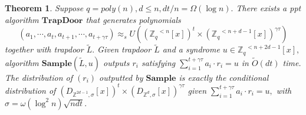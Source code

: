 \documentclass[11pt]{article}
\newcommand{\poly}[2]{{#1}^{<#2}[x]}
\newcommand{\Z}{\mathbb{Z}}
\newtheorem{theorem}{Theorem}[section]
\begin{document}
     \begin{theorem} \label{thm:trapdoor}
     Suppose $q= poly(n), d\leq n, dt/n = \Omega(\log n).$ There exists a ppt algorithm $\textbf{TrapDoor}$ that generates polynomials $$(a_1, \cdots, a_t, a_{t+1},\cdots, a_{t + \gamma \tau} ) \approx_s U((\poly{\Z_q}{n})^t \times (\poly{\Z_q}{n+d-1})^{\gamma \tau})$$ together with trapdoor $\tilde{L}.$ Given trapdoor $\tilde{L}$ and a syndrome $u\in \poly{\Z_q}{n+2d-1},$ algorithm $\textbf{Sample}(\tilde{L}, u)$ outputs $r_i$ satisfying $\sum_{i=1}^{t+\gamma \tau} a_i \cdot r_i = u$ in $\tilde{O}(dt)$ time. The distribution of $(r_i)$ outputted by $\textbf{Sample}$ is exactly the conditional distribution of $(D_{\Z^{2d-1}, \sigma} [x])^t \times (D_{\Z^d, \sigma}[x])^{\gamma \tau}$ given $\sum_{i=1}^{t+\gamma \tau}  a_i \cdot r_i = u,$ with $\sigma =  \omega (\log^2 n) \sqrt{n dt}.$   
     \end{theorem}
\end{document}
